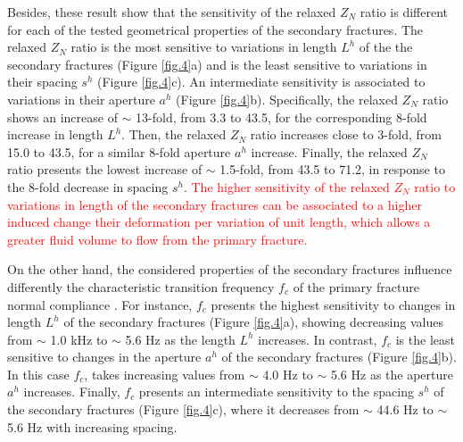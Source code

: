 \documentclass[draft]{agujournal2019}
\newcommand{\red}{\textcolor{red}}
\begin{document}
Besides, these result show that the sensitivity of the relaxed $Z_N$ ratio is different for each of the tested geometrical properties of the secondary fractures.
The relaxed $Z_N$ ratio is the most sensitive to variations in length $L^h$ of the the secondary fractures (Figure \ref{fig.4}a) and is the least sensitive to variations in their spacing $s^h$ (Figure \ref{fig.4}c). An intermediate sensitivity is associated to variations in their aperture $a^h$ (Figure \ref{fig.4}b). Specifically, the relaxed $Z_N$ ratio shows an increase of $\sim$ 13-fold, from  3.3 to 43.5, for the corresponding 8-fold increase in length $L^h$. Then, the relaxed $Z_N$ ratio increases close to 3-fold, from 15.0 to 43.5, for a similar 8-fold aperture $a^h$ increase. Finally, the relaxed $Z_N$ ratio presents the lowest increase of $\sim$ 1.5-fold, from 43.5 to 71.2, in response to the 8-fold decrease in spacing $s^h$. 
\red{ The higher sensitivity of the relaxed $Z_N$ ratio to variations in length of the secondary fractures can be associated  to a higher induced change their deformation per variation of unit length, which allows a greater fluid volume to flow from the primary fracture.}



On the other hand, the considered properties of the secondary fractures influence differently the characteristic transition frequency $f_c$ of the primary fracture normal compliance . For instance, $f_c$ presents the highest sensitivity to changes in length $L^h$ of the secondary fractures (Figure \ref{fig.4}a), showing decreasing values from $\sim$ 1.0 kHz to $\sim$ 5.6 Hz as the length $L^h$ increases. In contrast, $f_c$ is the least sensitive to changes in the aperture $a^h$ of the secondary fractures (Figure \ref{fig.4}b). In this case $f_c$, takes increasing values from  $\sim$ 4.0 Hz to  $\sim$ 5.6 Hz as the aperture $a^h$ increases. Finally, $f_c$ presents an intermediate sensitivity to the spacing $s^h$ of the secondary fractures (Figure \ref{fig.4}c), where it decreases from  $\sim$ 44.6 Hz to  $\sim$ 5.6 Hz with increasing spacing.
\end{document}
